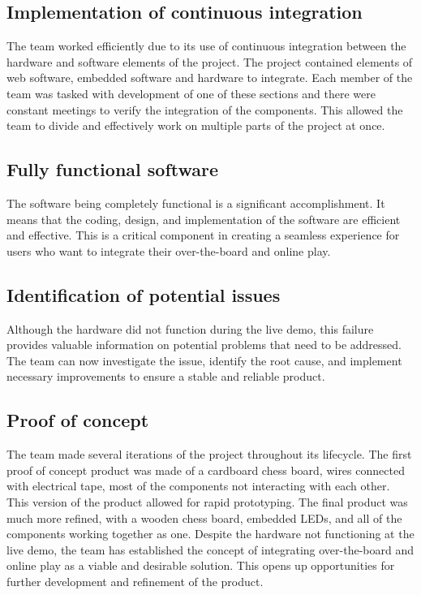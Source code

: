 \documentclass{article}
\begin{document}
\subsection{Implementation of continuous integration} 
The team worked efficiently due to its use of continuous integration between the hardware and
software elements of the project. The project contained elements of web software, embedded 
software and hardware to integrate. Each member of the team was tasked with development of one 
of these sections and there were constant meetings to verify the integration of the components. 
This allowed the team to divide and effectively work on multiple parts of the project at once.

\subsection{Fully functional software}
The software being completely functional is a significant accomplishment. It means that the coding, design, and implementation of the software are efficient and effective. This is a critical component in creating a seamless experience for users who want to integrate their over-the-board and online play.

\subsection{Identification of potential issues}
Although the hardware did not function during the live demo, this failure provides valuable information on potential problems that need to be addressed. The team can now investigate the issue, identify the root cause, and implement necessary improvements to ensure a stable and reliable product.

\subsection{Proof of concept}
The team made several iterations of the project throughout its lifecycle. The first proof of concept product was made of a cardboard chess board, wires connected with electrical tape, most of the components not interacting with each other. This version of the product allowed
for rapid prototyping. The final product was much more refined, with a wooden chess board, embedded LEDs, and all of the components working together as one.
Despite the hardware not functioning at the live demo, the team has established the concept of integrating over-the-board and online play as a viable and desirable solution. This opens up opportunities for further development and refinement of the product.
\end{document}
